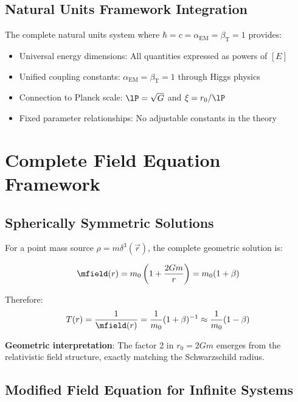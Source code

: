 	\subsection{Natural Units Framework Integration}
	\label{subsec:natural_units_integration}
	
	The complete natural units system where $\hbar = c = \alpha_{\text{EM}} = \beta_{\text{T}} = 1$ provides:
	\begin{itemize}
		\item Universal energy dimensions: All quantities expressed as powers of $[E]$
		\item Unified coupling constants: $\alpha_{\text{EM}} = \beta_{\text{T}} = 1$ through Higgs physics
		\item Connection to Planck scale: $\lP = \sqrt{G}$ and $\xi = r_0/\lP$
		\item Fixed parameter relationships: No adjustable constants in the theory
	\end{itemize}
	
	\section{Complete Field Equation Framework}
	\label{sec:field_equation_framework}
	
	\subsection{Spherically Symmetric Solutions}
	\label{subsec:spherical_solutions}
	
	For a point mass source $\rho = m \delta^3(\vec{r})$, the complete geometric solution is:
	
	\begin{equation}
		\mfield(r) = m_0\left(1 + \frac{2Gm}{r}\right) = m_0(1 + \beta)
		\label{eq:mass_field_solution}
	\end{equation}
	
	Therefore:
	\begin{equation}
		T(r) = \frac{1}{\mfield(r)} = \frac{1}{m_0}(1 + \beta)^{-1} \approx \frac{1}{m_0}(1 - \beta)
		\label{eq:time_field_solution}
	\end{equation}
	
	\textbf{Geometric interpretation}: The factor 2 in $r_0 = 2Gm$ emerges from the relativistic field structure, exactly matching the Schwarzschild radius.
	
	\subsection{Modified Field Equation for Infinite Systems}
	\label{subsec:infinite_systems}
	
